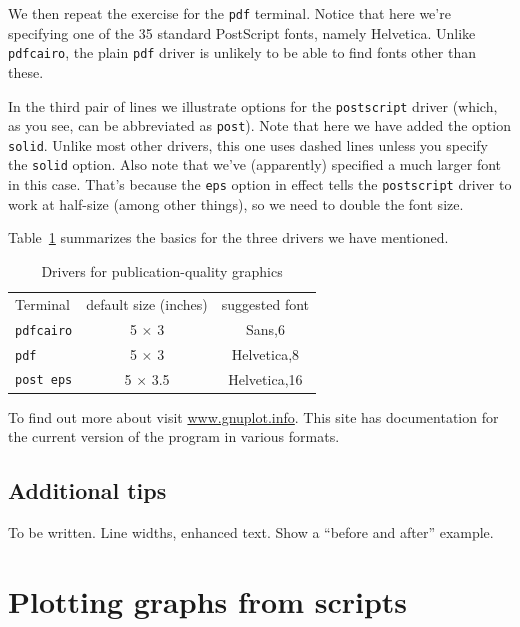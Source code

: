 We then repeat the exercise for the \texttt{pdf} terminal.  Notice
that here we're specifying one of the 35 standard PostScript fonts,
namely Helvetica.  Unlike \texttt{pdfcairo}, the plain \texttt{pdf}
driver is unlikely to be able to find fonts other than these.

In the third pair of lines we illustrate options for the
\texttt{postscript} driver (which, as you see, can be abbreviated as
\texttt{post}).  Note that here we have added the option
\texttt{solid}.  Unlike most other drivers, this one uses dashed lines
unless you specify the \texttt{solid} option.  Also note that we've
(apparently) specified a much larger font in this case.  That's
because the \texttt{eps} option in effect tells the
\texttt{postscript} driver to work at half-size (among other things),
so we need to double the font size.

Table~\ref{tab:drivers} summarizes the basics for the three drivers we
have mentioned.

\begin{table}[htbp]
  \centering
  \begin{tabular}{lcc}
    Terminal & default size (inches) & suggested font \\ [6pt]
    \texttt{pdfcairo} & 5 $\times$ 3 &   Sans,6 \\
    \texttt{pdf}      & 5 $\times$ 3 &   Helvetica,8 \\
    \texttt{post eps} & 5 $\times$ 3.5 & Helvetica,16 \\
  \end{tabular}
  \caption{Drivers for publication-quality graphics}
  \label{tab:drivers}
\end{table}

To find out more about  visit
\href{http://www.gnuplot.info/}{www.gnuplot.info}. This site has
documentation for the current version of the program in various
formats.

\subsection{Additional tips}
\label{subsect-graph-tips}

To be written.  Line widths, enhanced text.  Show a ``before and
after'' example.  

\section{Plotting graphs from scripts}
\label{sec:plotenv}


